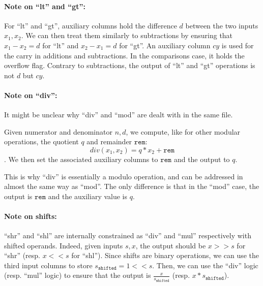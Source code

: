 \paragraph*{Note on ``lt'' and ``gt'':} For ``lt'' and ``gt'', auxiliary columns hold the difference $d$ between the two inputs $x_1, x_2$. We can then treat them similarly to subtractions by ensuring that $x_1 - x_2 = d$ for ``lt'' and $x_2 - x_1 = d$ for ``gt''. An auxiliary column $cy$ is used for the carry in additions and subtractions. In the comparisons case, it holds the overflow flag. Contrary to subtractions, the output of ``lt'' and ``gt'' operations is not $d$ but $cy$. 

\paragraph*{Note on ``div'':} It might be unclear why ``div'' and ``mod'' are dealt with in the same file. 

Given numerator and denominator $n, d$, we compute, like for other modular operations, the quotient $q$ and remainder $\texttt{rem}$: 
$$div(x_1, x_2) = q * x_2 + \texttt{rem}$$. 
We then set the associated auxiliary columns to $\texttt{rem}$ and the output to $q$. 

This is why ``div'' is essentially a modulo operation, and can be addressed in almost the same way as ``mod''. The only difference is that in the ``mod'' case, the output is $\texttt{rem}$ and the auxiliary value is $q$.

\paragraph{Note on shifts:} ``shr'' and ``shl'' are internally constrained as ``div'' and ``mul'' respectively with shifted operands. Indeed, given inputs $s, x$, the output should be $x >> s$ for ``shr'' (resp. $x << s$ for ``shl''). Since shifts are binary operations, we can use the third input columns to store $s_{\texttt{shifted}} = 1 << s$. Then, we can use the ``div'' logic (resp. ``mul'' logic) to ensure that the output is $\frac{x}{s_{\texttt{shifted}}}$ (resp. $x * s_{\texttt{shifted}}$).